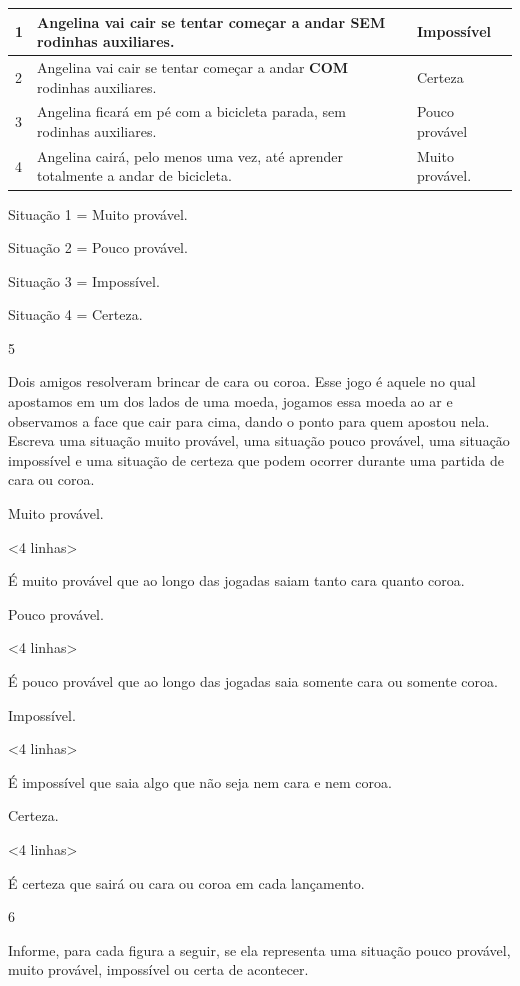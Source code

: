 {{{{{{{{{{{{{\begin{longtable}[]{@{}llll@{}}
\toprule
1 & Angelina vai cair se tentar começar a andar \textbf{SEM} rodinhas
auxiliares. & & Impossível\tabularnewline
\midrule
\endhead
2 & Angelina vai cair se tentar começar a andar \textbf{COM} rodinhas
auxiliares. & & Certeza\tabularnewline
3 & Angelina ficará em pé com a bicicleta parada, sem rodinhas
auxiliares. & & Pouco provável\tabularnewline
4 & Angelina cairá, pelo menos uma vez, até aprender totalmente a andar
de bicicleta. & & Muito provável.\tabularnewline
\bottomrule
\end{longtable}

Situação 1 = Muito provável.

Situação 2 = Pouco provável.

Situação 3 = Impossível.

Situação 4 = Certeza.

\num{5}

Dois amigos resolveram brincar de cara ou coroa. Esse jogo é aquele no
qual apostamos em um dos lados de uma moeda, jogamos essa moeda ao ar e observamos a face
que cair para cima, dando o ponto para quem apostou nela. Escreva uma
situação muito provável, uma situação pouco provável, uma situação
impossível e uma situação de certeza que podem ocorrer durante uma partida de cara ou coroa.

Muito provável.

\textless{}4 linhas\textgreater{}

É muito provável que ao longo das jogadas saiam tanto cara quanto coroa.

Pouco provável.

\textless{}4 linhas\textgreater{}

É pouco provável que ao longo das jogadas saia somente cara ou somente coroa.

Impossível.

\textless{}4 linhas\textgreater{}

É impossível que saia algo que não seja nem cara e nem coroa.

Certeza.

\textless{}4 linhas\textgreater{}

É certeza que sairá ou cara ou coroa em cada lançamento.

\num{6}

Informe, para cada figura a seguir, se ela representa uma situação pouco
provável, muito provável, impossível ou certa de acontecer.

}}}}}}}}}}}}}
